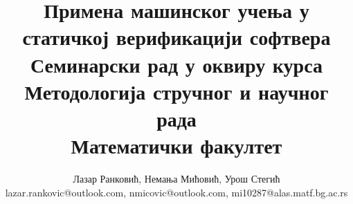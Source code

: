 \documentclass[a4paper]{article}
\begin{document}
\title{Примена машинског учења у статичкој верификацији софтвера\\ \small{Семинарски рад у оквиру курса\\Методологија стручног и научног рада\\ Математички факултет}}

\author{Лазар Ранковић, Немања Мићовић, Урош Стегић\\ lazar.rankovic@outlook.com, nmicovic@outlook.com, mi10287@alas.matf.bg.ac.rs}
\date{}
\maketitle

\end{document}
